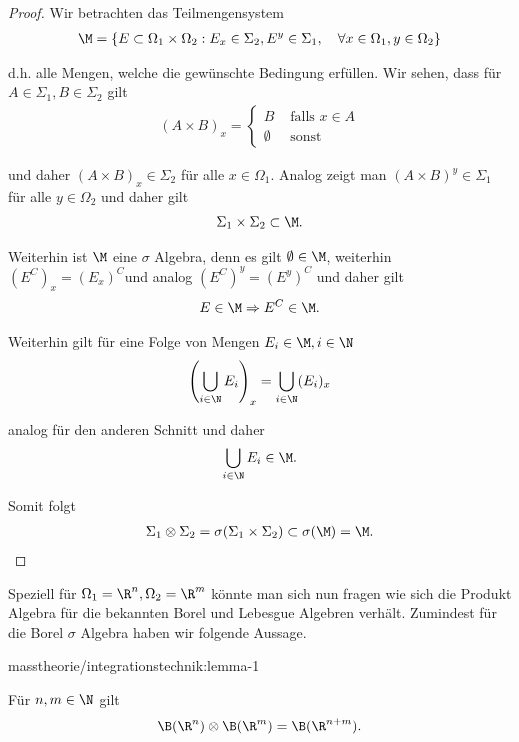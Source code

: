 \documentclass[letterpaper,10pt,german]{jupyterBook}
\begin{document}
\begin{proof}
 Wir betrachten das Teilmengensystem
\begin{align*}
\M = \{E\subset\Omega_1\times\Omega_2:  E_x\in\Sigma_2, E^y\in\Sigma_1,\quad\forall x\in\Omega_1,  y\in\Omega_2\}
\end{align*}
\par
d.h. alle Mengen, welche die gewünschte Bedingung erfüllen. Wir sehen, dass für \(A\in\Sigma_1,B\in\Sigma_2\) gilt
\begin{align*}
(A\times B)_x = 
\begin{cases}
B &\text{ falls }x\in A\\
\emptyset &\text{ sonst}
\end{cases}
\end{align*}
\par
und daher \((A\times B)_x\in\Sigma_2\) für alle \(x\in\Omega_1\). Analog zeigt man \((A\times B)^y\in\Sigma_1\) für alle \(y\in\Omega_2\) und daher gilt
\begin{align*}
\Sigma_1\times\Sigma_2\subset \M.
\end{align*}
\par
Weiterhin ist \(\M\) eine \(\sigma\) Algebra, denn es gilt \(\emptyset\in\M\), weiterhin \((E^C)_x = (E_x)^C\)und analog \((E^C)^y= (E^y)^C\) und daher
gilt
\begin{align*}
E\in\M\Rightarrow E^C\in\M.
\end{align*}
\par
Weiterhin gilt für eine Folge von Mengen \(E_i\in\M,i\in\N\)
\begin{align*}
\left(\bigcup_{i\in\N} E_i\right)_x = \bigcup_{i\in\N} (E_i)_x
\end{align*}
\par
analog für den anderen Schnitt und daher
\begin{align*}
\bigcup_{i\in\N} E_i\in\M.
\end{align*}
\par
Somit folgt
\begin{align*}
\Sigma_1\otimes\Sigma_2=\sigma(\Sigma_1\times\Sigma_2)\subset \sigma(\M) = \M.
\end{align*}\end{proof}

\par
Speziell für \(\Omega_1=\R^n, \Omega_2=\R^m\) könnte man sich nun fragen wie sich die Produkt Algebra für die bekannten Borel und Lebesgue Algebren verhält. Zumindest für die Borel \(\sigma\) Algebra haben wir folgende Aussage.
\begin{lemma}{}{masstheorie/integrationstechnik:lemma-1}



\par
Für \(n,m\in\N\) gilt
\begin{align*}
\B(\R^n)\otimes \B(\R^m) = \B(\R^{n+m}).
\end{align*}\end{lemma}
\end{document}
